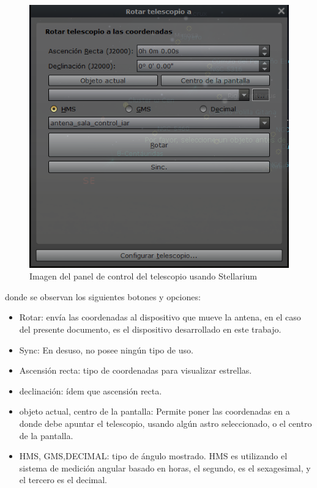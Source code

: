 \begin{figure}[ht!]
	\includegraphics{rotar_telesc}
	\caption{Imagen del panel de control del telescopio usando Stellarium}
	\label{control del telescopio en stellarium}
\end{figure}
donde se observan los siguientes botones y opciones: 
\begin{itemize}
	\item Rotar: envía las coordenadas al dispositivo que mueve la antena, en el caso del presente documento, es el dispositivo desarrollado en este trabajo. 
	\item Sync: En desuso, no posee ningún tipo de uso. 
	\item Ascensión recta: tipo de coordenadas para visualizar estrellas. 
	\item declinación: ídem que ascensión recta.  
	\item objeto actual, centro de la pantalla: Permite poner las coordenadas en a donde debe apuntar el telescopio, usando algún astro seleccionado, o el centro de la pantalla. 
	\item HMS, GMS,DECIMAL: tipo de ángulo mostrado. HMS es utilizando el sistema de medición angular basado en horas, el segundo, es el sexagesimal, y el tercero es el decimal. 
\end{itemize}

